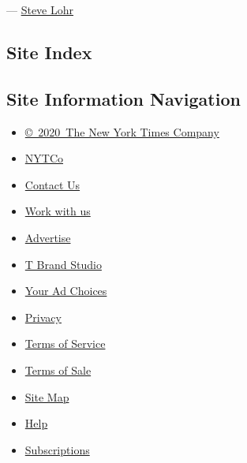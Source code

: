 --- \href{https://www.nytimes.com/by/steve-lohr}{Steve Lohr}

\hypertarget{site-index}{%
\subsection{Site Index}\label{site-index}}

\hypertarget{site-information-navigation}{%
\subsection{Site Information
Navigation}\label{site-information-navigation}}

\begin{itemize}
\tightlist
\item
  \href{https://help.nytimes.com/hc/en-us/articles/115014792127-Copyright-notice}{©~2020~The
  New York Times Company}
\end{itemize}

\begin{itemize}
\tightlist
\item
  \href{https://www.nytco.com/}{NYTCo}
\item
  \href{https://help.nytimes.com/hc/en-us/articles/115015385887-Contact-Us}{Contact
  Us}
\item
  \href{https://www.nytco.com/careers/}{Work with us}
\item
  \href{https://nytmediakit.com/}{Advertise}
\item
  \href{http://www.tbrandstudio.com/}{T Brand Studio}
\item
  \href{https://www.nytimes.com/privacy/cookie-policy\#how-do-i-manage-trackers}{Your
  Ad Choices}
\item
  \href{https://www.nytimes.com/privacy}{Privacy}
\item
  \href{https://help.nytimes.com/hc/en-us/articles/115014893428-Terms-of-service}{Terms
  of Service}
\item
  \href{https://help.nytimes.com/hc/en-us/articles/115014893968-Terms-of-sale}{Terms
  of Sale}
\item
  \href{https://spiderbites.nytimes.com}{Site Map}
\item
  \href{https://help.nytimes.com/hc/en-us}{Help}
\item
  \href{https://www.nytimes.com/subscription?campaignId=37WXW}{Subscriptions}
\end{itemize}
